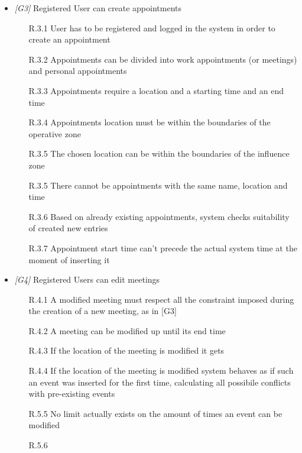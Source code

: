 \begin{itemize}
\item \textit{[G3]} Registered User can create appointments 

 \begin{itemize}
                        \item [R.3.1] User has to be registered and logged in the system in order to create an
appointment
                        \item [R.3.2] Appointments can be divided into work appointments (or meetings) and personal appointments
                        \item [R.3.3] Appointments require a location and a starting time and an end time
                        \item [R.3.4] Appointments location must be within the boundaries of the operative zone
                        \item [R.3.5] The chosen location can be within the boundaries of the influence zone
                        \item [R.3.5] There cannot be appointments with the same name, location and time
                        \item [R.3.6] Based on already existing appointments, system checks suitability of created new entries
                        \item [R.3.7] Appointment start time can't precede the actual system time at the moment of inserting it                        
                  \end{itemize}
                  
\item \textit{[G4]} Registered Users can edit meetings

                  \begin{itemize}
                       \item  [R.4.1] A modified meeting must respect all the constraint imposed during the creation of a new meeting, as in [G3]
                       \item [R.4.2] A meeting can be modified up until its end time
                       \item [R.4.3] If the location of the meeting is modified it gets 
                       \item [R.4.4] If the location of the meeting is modified system behaves as if such an event was inserted for the first time, calculating all possibile conflicts with pre-existing events
                       \item [R.5.5] No limit actually exists on the amount of times an event can be modified
                       \item [R.5.6] 
                     



\end{itemize}
\end{itemize}
